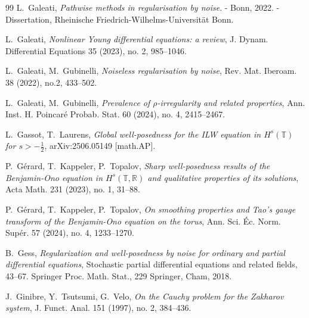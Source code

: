 \documentclass[letterpaper, 11pt,  reqno]{amsart}
\newcommand{\1}{\hspace{0.5mm}\text{I}\hspace{0.5mm}}
\newcommand{\R}{\mathbb{R}}
\newcommand{\T}{\mathbb{T}}
\numberwithin{equation}{section}
\numberwithin{theorem}{section}
\begin{document}
\begin{thebibliography}{99}
L.~Galeati, 
{\it Pathwise methods in regularisation by noise}. - Bonn, 2022. - Dissertation, 
Rheinische Friedrich-Wilhelms-Universit\"at Bonn. 

L.~Galeati, 
{\it Nonlinear {Y}oung differential equations: a review}, 
J. Dynam. Differential Equations 35 (2023), no. 2, 985--1046.



L.~Galeati, M.~Gubinelli,
{\it Noiseless regularisation by noise}, 
Rev. Mat. Iberoam. 38 (2022), no.2, 433--502.




L.~Galeati, M.~Gubinelli,
{\it  Prevalence of $\rho$-irregularity and related properties},
 Ann. Inst. H. Poincar\'e Probab. Stat.
 60 (2024), no. 4, 2415--2467.


%
%
%



L.~Gassot, T.~Laurens, 
{\it Global well-posedness for the ILW equation in $H^s(\mathbb{T})$ for $s>-\frac12$}, 
arXiv:2506.05149 [math.AP].


P.~G\'erard, T.~Kappeler, P.~Topalov,
{\it  Sharp well-posedness results of the Benjamin-Ono equation in $H^s(\T, \R)$  and qualitative properties of its solutions}, 
Acta Math. 231 (2023), no. 1,  31--88.



P.~G\'erard, T.~Kappeler, P.~Topalov,
{\it On smoothing properties and Tao's gauge transform of the Benjamin-Ono equation on the torus},
 Ann. Sci. \'Ec. Norm. Sup\'er.  57 (2024), no. 4, 1233--1270.



B.~Gess, 
{\it Regularization and well-posedness by noise for ordinary and partial differential equations},
 Stochastic partial differential equations and related fields, 43--67. Springer Proc. Math. Stat., 229
Springer, Cham, 2018.




J.~Ginibre, Y.~Tsutsumi, G.~Velo, 
{\it On the Cauchy problem for the Zakharov system}, 
J. Funct. Anal. 151 (1997), no. 2, 384--436.

%
%


\end{thebibliography}
\end{document}
